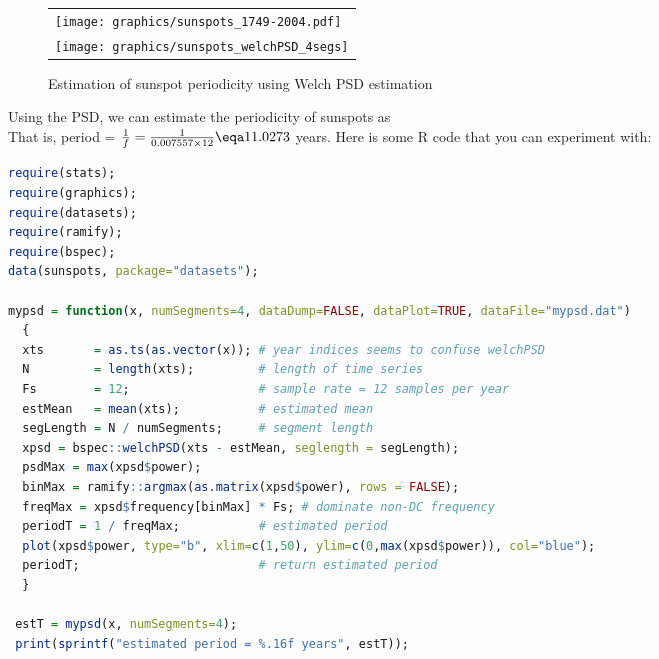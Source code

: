 \begin{figure}
  \centering
  \begin{tabular}{l}
    \texttt{[image: graphics/sunspots\_1749-2004.pdf]}\\
    \texttt{[image: graphics/sunspots\_welchPSD\_4segs]}
  \end{tabular}
  \caption{Estimation of sunspot periodicity using Welch PSD estimation\label{fig:sunspot_welch}}
\end{figure}
\begin{example}
Using the PSD, we can estimate the periodicity of sunspots  as
\\
That is, period = $\frac{1}{f}=\frac{1}{0.007557\times12}\eqa11.0273$ years.
Here is some R code that you can experiment with:
\begin{lstlisting}[language=R]
require(stats);
require(graphics);
require(datasets);
require(ramify);
require(bspec);
data(sunspots, package="datasets");

mypsd = function(x, numSegments=4, dataDump=FALSE, dataPlot=TRUE, dataFile="mypsd.dat") 
  {
  xts       = as.ts(as.vector(x)); # year indices seems to confuse welchPSD
  N         = length(xts);         # length of time series
  Fs        = 12;                  # sample rate = 12 samples per year
  estMean   = mean(xts);           # estimated mean
  segLength = N / numSegments;     # segment length
  xpsd = bspec::welchPSD(xts - estMean, seglength = segLength);
  psdMax = max(xpsd$power);
  binMax = ramify::argmax(as.matrix(xpsd$power), rows = FALSE);
  freqMax = xpsd$frequency[binMax] * Fs; # dominate non-DC frequency
  periodT = 1 / freqMax;           # estimated period
  plot(xpsd$power, type="b", xlim=c(1,50), ylim=c(0,max(xpsd$power)), col="blue");
  periodT;                         # return estimated period
  }

 estT = mypsd(x, numSegments=4);
 print(sprintf("estimated period = %.16f years", estT));
\end{lstlisting}
\end{example}
